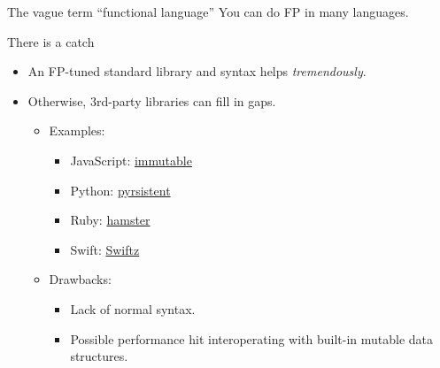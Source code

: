 \begin{frame}{The vague term ``functional language''}
  You can do FP in many languages.

  \begin{alertblock}{There is a catch}
    \begin{itemize}
    \item An FP-tuned standard library and syntax helps \emph{tremendously}.
    \item Otherwise, 3rd-party libraries can fill in gaps.
      \begin{itemize}
      \item Examples:
        \begin{itemize}
        \item JavaScript:
          \href{https://github.com/facebook/immutable-js}{immutable}
        \item Python:
          \href{https://github.com/tobgu/pyrsistent}{pyrsistent}
        \item Ruby:
          \href{https://github.com/hamstergem/hamster}{hamster}
        \item Swift: \href{https://github.com/typelift/swiftz}{Swiftz}
        \end{itemize}
      \item Drawbacks:
        \begin{itemize}
        \item Lack of normal syntax.
        \item Possible performance hit interoperating with built-in
          mutable data structures.
        \end{itemize}
      \end{itemize}
    \end{itemize}
  \end{alertblock}

\end{frame}

